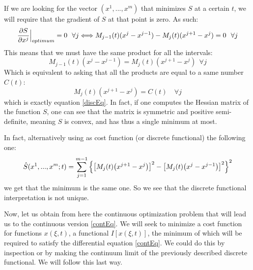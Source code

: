 \documentclass[11pt, a4paper]{article} %
\begin{document}
If we are looking for the vector $(x^1,...,x^m)$ that minimizes $S$ at a certain $t$, we will require that the gradient of $S$ at that point is zero. As such:
\begin{equation}
\pdv{S}{x^j}\Big\rvert_{optimum}=0\ \ \forall j\Longleftrightarrow M_{j-1}(t)(x^j-x^{j-1})-M_j(t)(x^{j+1}-x^j)=0\ \ \forall j
\end{equation}
This means that we must have the same product for all the intervals:
\begin{equation}
 M_{j-1}(t)(x^j-x^{j-1})=M_j(t)(x^{j+1}-x^j)\ \ \forall j
\end{equation}
Which is equivalent to asking that all the products are equal to a same number $C(t)$:
\begin{equation}
M_j(t)(x^{j+1}-x^j)=C(t) \quad \forall j
\end{equation}
which is exactly equation \eqref{discEq}. In fact, if one computes the Hessian matrix of the function $S$, one can see that the matrix is symmetric and positive semi-definite, meaning $S$ is convex, and has thus a single minimum at most. 

In fact, alternatively using as cost function (or discrete functional) the following one:
\begin{equation}
\hat{S}(x^1,...,x^m;t)=\sum_{j=1}^{m-1} \qty{\qty[ M_j(t) \qty(x^{j+1}-x^j)]^2-\qty[ M_j(t) \qty(x^{j}-x^{j-1})]^2}^2
\end{equation}
we get that the minimum is the same one. So we see that the discrete functional interpretation is not unique.

Now, let us obtain from here the continuous optimization problem that will lead us to the continuous version \eqref{contEq}. We will seek to minimize a cost function for functions $x(\xi,t)$, a functional $I[x(\xi,t)]$, the minimum of which will be required to satisfy the differential equation \eqref{contEq}. We could do this by inspection or by making the continuum limit of the previously described discrete functional. We will follow this last way.
\end{document}
